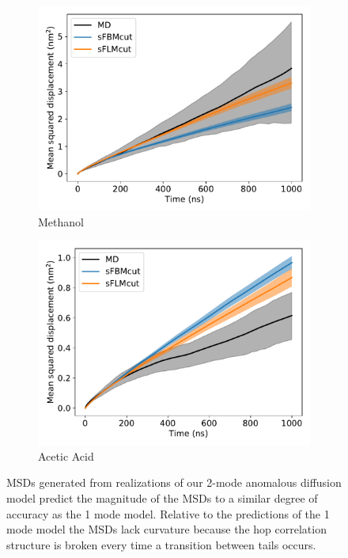 \documentclass[12pt]{article}
\begin{document}
\begin{figure}
\begin{subfigure}{0.45\textwidth}
  \includegraphics[width=\textwidth]{2mode_msd_comparison_MET.pdf}
  \caption{Methanol}\label{fig:2mode_msd_comparison_MET}
  \end{subfigure}
  \begin{subfigure}{0.45\textwidth}
  \includegraphics[width=\textwidth]{2mode_msd_comparison_ACH.pdf}
  \caption{Acetic Acid}\label{fig:2mode_msd_comparison_ACH}
  \end{subfigure}
  \caption{MSDs generated from realizations of our 2-mode anomalous diffusion model
  predict the magnitude of the MSDs to a similar degree of accuracy as the 1 mode
  model. Relative to the predictions of the 1 mode model the MSDs lack curvature because
  the hop correlation structure is broken every time a transition between tails occurs.}\label{fig:anomalous_msds_2mode}
  \end{figure}
  
\end{document}
